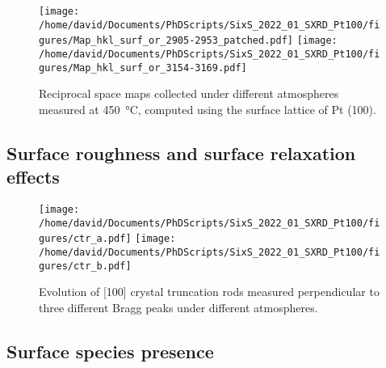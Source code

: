 \begin{figure}[!htb]
    \centering
    \texttt{[image: /home/david/Documents/PhDScripts/SixS\_2022\_01\_SXRD\_Pt100/figures/Map\_hkl\_surf\_or\_2905-2953\_patched.pdf]}
    \texttt{[image: /home/david/Documents/PhDScripts/SixS\_2022\_01\_SXRD\_Pt100/figures/Map\_hkl\_surf\_or\_3154-3169.pdf]}
    \caption{
        Reciprocal space maps collected under different atmospheres measured at \qty{450}{\degreeCelsius}, computed using the surface lattice of Pt (100).
    }
    \label{fig:MapsLowOxygen}
\end{figure}


\subsection{Surface roughness and surface relaxation effects}

\begin{figure}[!htb]
    \centering
    \texttt{[image: /home/david/Documents/PhDScripts/SixS\_2022\_01\_SXRD\_Pt100/figures/ctr\_a.pdf]}
    \texttt{[image: /home/david/Documents/PhDScripts/SixS\_2022\_01\_SXRD\_Pt100/figures/ctr\_b.pdf]}
    \caption{
        Evolution of [100] crystal truncation rods measured perpendicular to three different Bragg peaks under different atmospheres.
    }
    \label{fig:CTRPt100}
\end{figure}

\subsection{Surface species presence}

